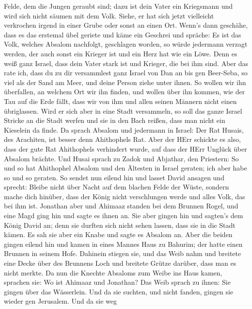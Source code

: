 Felde, dem die Jungen geraubt sind; dazu ist dein Vater ein Kriegsmann
und wird sich nicht säumen mit dem Volk.  Siehe, er hat sich
jetzt vielleicht verkrochen irgend in einer Grube oder sonst an einen
Ort. Wenn's dann geschähe, dass es das erstemal übel geriete und käme
ein Geschrei und spräche: Es ist das Volk, welches Absalom nachfolgt,
geschlagen worden,  so würde jedermann verzagt werden, der
auch sonst ein Krieger ist und ein Herz hat wie ein Löwe. Denn es weiß
ganz Israel, dass dein Vater stark ist und Krieger, die bei ihm sind.
 Aber das rate ich, dass du zu dir versammlest ganz Israel
von Dan an bis gen Beer-Seba, so viel als der Sand am Meer, und deine
Person ziehe unter ihnen.  So wollen wir ihn überfallen, an
welchem Ort wir ihn finden, und wollen über ihn kommen, wie der Tau auf
die Erde fällt, dass wir von ihm und allen seinen Männern nicht einen
übriglassen.  Wird er sich aber in eine Stadt versammeln,
so soll das ganze Israel Stricke an die Stadt werfen und sie in den Bach
reißen, dass man nicht ein Kieselein da finde.  Da sprach
Absalom und jedermann in Israel: Der Rat Husais, des Arachiten, ist
besser denn Ahithophels Rat. Aber der HErr schickte es also, dass der
gute Rat Ahithophels verhindert wurde, auf dass der HErr Unglück über
Absalom brächte.  Und Husai sprach zu Zadok und Abjathar,
den Priestern: So und so hat Ahithophel Absalom und den Ältesten in
Israel geraten; ich aber habe so und so geraten.  So sendet
nun eilend hin und lasset David ansagen und sprecht: Bleibe nicht über
Nacht auf dem blachen Felde der Wüste, sondern mache dich hinüber, dass
der König nicht verschlungen werde und alles Volk, das bei ihm ist.
 Jonathan aber und Ahimaaz standen bei dem Brunnen Rogel,
und eine Magd ging hin und sagte es ihnen an. Sie aber gingen hin und
sagten's dem König David an; denn sie durften sich nicht sehen lassen,
dass sie in die Stadt kämen.  Es sah sie aber ein Knabe und
sagte es Absalom an. Aber die beiden gingen eilend hin und kamen in
eines Mannes Haus zu Bahurim; der hatte einen Brunnen in seinem Hofe.
Dahinein stiegen sie,  und das Weib nahm und breitete eine
Decke über des Brunnens Loch und breitete Grütze darüber, dass man es
nicht merkte.  Da nun die Knechte Absaloms zum Weibe ins
Haus kamen, sprachen sie: Wo ist Ahimaaz und Jonathan? Das Weib sprach
zu ihnen: Sie gingen über das Wässerlein. Und da sie suchten, und nicht
fanden, gingen sie wieder gen Jerusalem.  Und da sie weg
